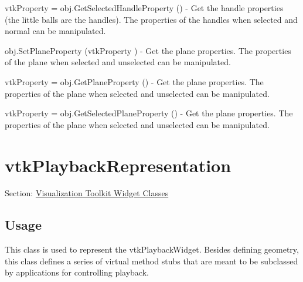 \begin{DoxyItemize}
\item {\ttfamily vtk\-Property = obj.\-Get\-Selected\-Handle\-Property ()} -\/ Get the handle properties (the little balls are the handles). The properties of the handles when selected and normal can be manipulated.  
\item {\ttfamily obj.\-Set\-Plane\-Property (vtk\-Property )} -\/ Get the plane properties. The properties of the plane when selected and unselected can be manipulated.  
\item {\ttfamily vtk\-Property = obj.\-Get\-Plane\-Property ()} -\/ Get the plane properties. The properties of the plane when selected and unselected can be manipulated.  
\item {\ttfamily vtk\-Property = obj.\-Get\-Selected\-Plane\-Property ()} -\/ Get the plane properties. The properties of the plane when selected and unselected can be manipulated.  
\end{DoxyItemize}\hypertarget{vtkwidgets_vtkplaybackrepresentation}{}\section{vtk\-Playback\-Representation}\label{vtkwidgets_vtkplaybackrepresentation}
Section\-: \hyperlink{sec_vtkwidgets}{Visualization Toolkit Widget Classes} \hypertarget{vtkwidgets_vtkxyplotwidget_Usage}{}\subsection{Usage}\label{vtkwidgets_vtkxyplotwidget_Usage}
This class is used to represent the vtk\-Playback\-Widget. Besides defining geometry, this class defines a series of virtual method stubs that are meant to be subclassed by applications for controlling playback.

